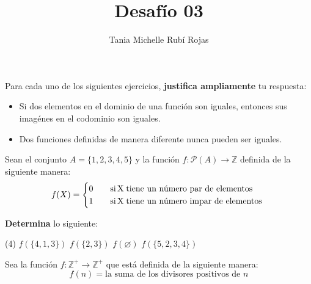 \documentclass[oneside]{style}
\title{Desafío 03}
\author{Tania Michelle Rubí Rojas}
\begin{document}
\maketitle

Para cada uno de los siguientes ejercicios, \textbf{justifica ampliamente} tu 
respuesta:

\begin{questions}[label=\protect\circled{\bfseries\arabic*}]
    \begin{itemize}
        \item Si dos elementos en el dominio de una función son iguales, 
        entonces sus imagénes en el codominio son iguales.  

        \item Dos funciones definidas de manera diferente nunca pueden ser 
        iguales. 
    \end{itemize}

    \question
    {
        Sean el conjunto $A = \{1,2,3,4,5\}$ y la función 
        $f: \mathcal{P}(A) \rightarrow \mathbb{Z}$ definida de la siguiente 
        manera: 
        \begin{equation*}
            f(X)=\begin{cases}
                      0 \quad &\text{si} \, $X$ \; \text{tiene un número par 
                      de elementos}\\
                      1 \quad &\text{si} \, $X$ \; \text{tiene un número impar 
                      de elementos }\\
                 \end{cases}
        \end{equation*}

        \textbf{Determina} lo siguiente:
        \begin{tasks}(4)
            \task $f(\{4,1,3\})$
            \task $f(\{2,3\})$
            \task $f(\varnothing)$
            \task $f(\{5,2,3,4\})$
        \end{tasks}
    }

    \question
    {
        Sea la función $f: \mathbb{Z}^+ \rightarrow \mathbb{Z}^+$ que 
        está definida de la siguiente manera:
        \begin{equation*}
            f(n) = \text{la suma de los divisores positivos de } n
        \end{equation*}

}
\end{questions}
\end{document}
